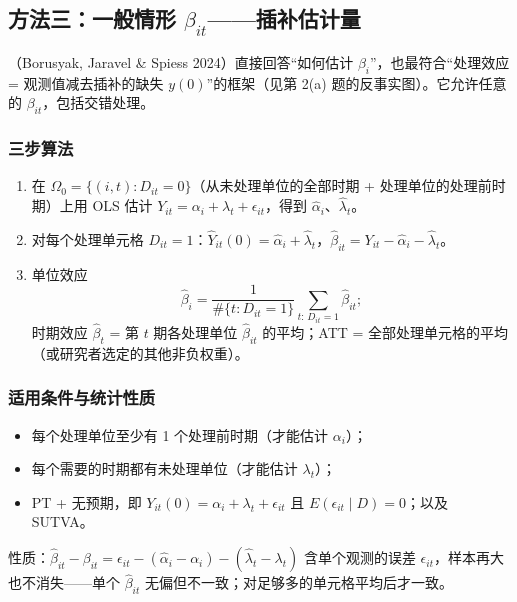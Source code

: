 \subsection{方法三：一般情形 \texorpdfstring{$\beta_{it}$}{beta\_it}——插补估计量}\label{sec:U17b-m3}

（Borusyak, Jaravel \& Spiess 2024）直接回答“如何估计 $\beta_i$”，也最符合“处理效应 = 观测值减去插补的缺失 $y(0)$”的框架（见第 2(a) 题的反事实图）。它允许任意的 $\beta_{it}$，包括交错处理。

\subsubsection{三步算法}

\begin{method}[插补估计量的三步]
\begin{enumerate}
  \item {}在 $\Omega_0=\{(i,t):D_{it}=0\}$（从未处理单位的全部时期 + 处理单位的处理前时期）上用 OLS 估计 $Y_{it}=\alpha_i+\lambda_t+\epsilon_{it}$，得到 $\hat\alpha_i$、$\hat\lambda_t$。
  \item {}对每个处理单元格 $D_{it}=1$：$\hat Y_{it}(0)=\hat\alpha_i+\hat\lambda_t$，$\hat\beta_{it}=Y_{it}-\hat\alpha_i-\hat\lambda_t$。
  \item {}单位效应
  \[
  \hat\beta_i=\frac{1}{\#\{t:D_{it}=1\}}\sum_{t:\,D_{it}=1}\hat\beta_{it};
  \]
  时期效应 $\hat\beta_t$ = 第 $t$ 期各处理单位 $\hat\beta_{it}$ 的平均；ATT = 全部处理单元格的平均（或研究者选定的其他非负权重）。
\end{enumerate}
\end{method}

\subsubsection{适用条件与统计性质}

\begin{itemize}
  \item 每个处理单位至少有 1 个处理前时期（才能估计 $\alpha_i$）；
  \item 每个需要的时期都有未处理单位（才能估计 $\lambda_t$）；
  \item PT + 无预期，即 $Y_{it}(0)=\alpha_i+\lambda_t+\epsilon_{it}$ 且 $E(\epsilon_{it}\mid D)=0$；以及 SUTVA。
\end{itemize}
性质：$\hat\beta_{it}-\beta_{it}=\epsilon_{it}-(\hat\alpha_i-\alpha_i)-(\hat\lambda_t-\lambda_t)$ 含单个观测的误差 $\epsilon_{it}$，样本再大也不消失——单个 $\hat\beta_{it}$ 无偏但不一致；对足够多的单元格平均后才一致。

